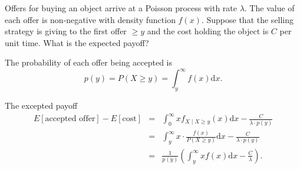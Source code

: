 \begin{example}
Offers for buying an object arrive at a Poisson process with rate $ \lambda $. The value of each offer is non-negative with density function $ f(x) $. Suppose that the selling strategy is giving to the first offer $ \ge y $ and the cost holding the object is $ C $ per unit time. What is the expected payoff?

The probability of each offer being accepted is
\[ p(y) = P(X \ge y) = \int_{y}^{\infty} f(x) \mathrm{d}x. \]

The excepted payoff
\begin{eqnarray*}
E[\text{accepted offer}] - E[\text{cost}]
  & = & \int_{0}^{\infty} xf_{X \mid X \ge y}(x) \mathrm{d}x - \frac{C}{\lambda \cdot p(y)} \\
  & = & \int_{y}^{\infty} x \cdot \frac{f(x)}{P(X \ge y)} \mathrm{d}x - \frac{C}{\lambda \cdot p(y)} \\
  & = & \frac{1}{p(y)} \left( \int_{y}^{\infty} xf(x) \mathrm{d}x - \frac{C}{\lambda} \right).
\end{eqnarray*}
\end{example}

